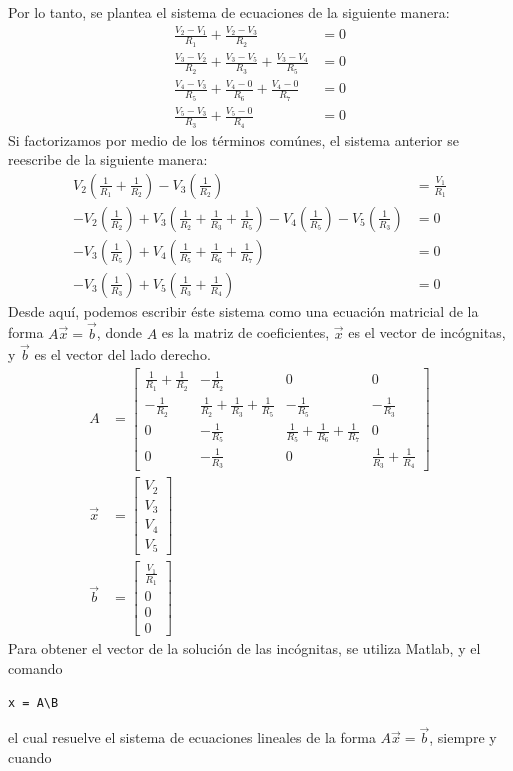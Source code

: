 \documentclass[12pt, letterpaper]{report}
\begin{document}
Por lo tanto, se plantea el sistema de ecuaciones de la siguiente manera: 
\begin{align}
\frac{V_2 - V_1}{R_1} + \frac{V_2 - V_3}{R_2} &= 0\\ 
\frac{V_3 - V_2}{R_2} + \frac{V_3 - V_5}{R_3} + \frac{V_3 - V_4}{R_5} &= 0\\ 
\frac{V_4 - V_3}{R_5} + \frac{V_4 - 0}{R_6} + \frac{V_4 - 0}{R_7} &= 0\\
\frac{V_5 - V_3}{R_3} + \frac{V_5 - 0}{R_4} &= 0
\end{align}
Si factorizamos por medio de los términos comúnes, el sistema anterior se reescribe de la siguiente manera: 
\begin{align}
V_2(\frac{1}{R_1} + \frac{1}{R_2}) - V_3(\frac{1}{R_2}) &= \frac{V_1}{R_1}\\
-V_2(\frac{1}{R_2}) + V_3(\frac{1}{R_2} + \frac{1}{R_3} + \frac{1}{R_5}) - V_4(\frac{1}{R_5}) - V_5(\frac{1}{R_3}) &= 0\\ 
-V_3(\frac{1}{R_5}) + V_4(\frac{1}{R_5} + \frac{1}{R_6} + \frac{1}{R_7}) &= 0\\ 
-V_3(\frac{1}{R_3}) + V_5(\frac{1}{R_3} + \frac{1}{R_4}) &= 0
\end{align}
Desde aquí, podemos escribir éste sistema como una ecuación matricial de la forma $A\vec{x} = \vec{b}$, donde $A$ es la 
matriz de coeficientes, $\vec{x}$ es el vector de incógnitas, y $\vec{b}$ es el vector del lado derecho. 
\begin{align}
A &= \begin{bmatrix}
\frac{1}{R_1} + \frac{1}{R_2} & -\frac{1}{R_2} & 0 & 0\\
-\frac{1}{R_2} & \frac{1}{R_2} + \frac{1}{R_3} + \frac{1}{R_5} & -\frac{1}{R_5} & -\frac{1}{R_3}\\ 
0 & -\frac{1}{R_5} & \frac{1}{R_5} + \frac{1}{R_6} + \frac{1}{R_7} & 0\\
0 & -\frac{1}{R_3} & 0 & \frac{1}{R_3} + \frac{1}{R_4}
\end{bmatrix}\\
\vec{x} &= \begin{bmatrix}
V_2 \\ 
V_3 \\ 
V_4 \\
V_5
\end{bmatrix}\\
\vec{b} &= \begin{bmatrix}
    \frac{V_1}{R_1} \\
    0 \\
    0 \\
    0
\end{bmatrix}
\end{align} Para obtener el vector de la solución de las incógnitas, se utiliza Matlab, y el comando \begin{verbatim}
x = A\B
\end{verbatim}el cual resuelve el sistema de ecuaciones lineales de la forma $A \vec{x} = \vec{b}$, siempre y cuando 
\end{document}
